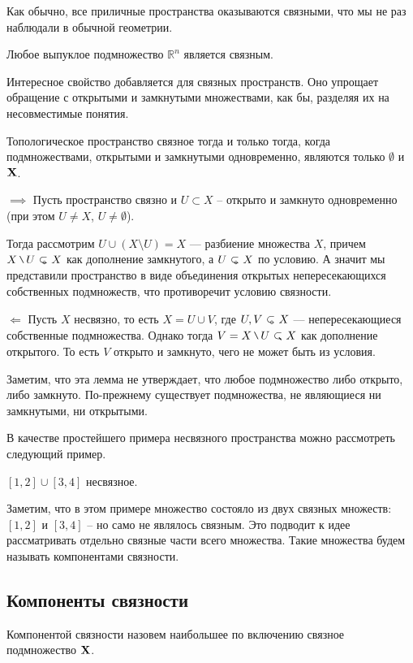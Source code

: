 Как обычно, все приличные пространства оказываются связными, что мы не раз наблюдали в обычной геометрии.
\begin{Ex}
    Любое выпуклое подмножество $\mathbb{R}^n$ является связным.
\end{Ex}

Интересное свойство добавляется для связных пространств. Оно упрощает обращение с открытыми и замкнутыми множествами, как бы, разделяя их на несовместимые понятия.
\begin{Lem}
    Топологическое пространство \topX связное тогда и только тогда, когда подмножествами, открытыми и замкнутыми одновременно, являются только $\emptyset$ и $\mathbf{X}$.
\end{Lem}
\begin{Proof}
    $\implies$ Пусть пространство связно и $U \subset X$ -- открыто и замкнуто одновременно (при этом $U \neq X$, $U\neq \emptyset$). 

    Тогда рассмотрим $U \cup (X \setminus U) = X$ --- разбиение множества $X$, причем $X\setminus U \open X$ как дополнение замкнутого, а $U\open X$ по условию. А значит мы представили пространство в виде объединения открытых непересекающихся собственных подмножеств, что противоречит условию связности.
    
    $\Longleftarrow$ Пусть $X$ несвязно, то есть $X = U \cup V$, где $U, V \open X$ --- непересекающиеся собственные подмножества. Однако тогда $V = X \setminus U \closed X$ как дополнение открытого. То есть $V$ открыто и замкнуто, чего не может быть из условия.
\end{Proof}
Заметим, что эта лемма не утверждает, что любое подмножество либо открыто, либо замкнуто. По-прежнему существует подмножества, не являющиеся ни замкнутыми, ни открытыми.


В качестве простейшего примера несвязного пространства можно рассмотреть следующий пример.
\begin{Ex}
    $[1,2] \cup [3,4]$ несвязное.
\end{Ex}
\begin{Note}
    Заметим, что в этом примере множество состояло из двух связных множеств: $[1,2]$ и $[3,4]$ -- но само не являлось связным. Это подводит к идее рассматривать отдельно связные части всего множества. Такие множества будем называть компонентами связности.
\end{Note}
\subsection{Компоненты связности}
\begin{Def}
    Компонентой связности назовем наибольшее по включению связное подмножество $ \mathbf{X}$.
\end{Def}


